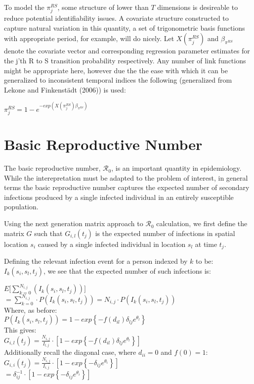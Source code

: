 \documentclass[12pt]{article}
\newcommand \mbreak {\\ \vspace{0.1in}}
\begin{document}
To model the $\pi_j^{RS}$, some structure of lower than $T$ dimensions is desireable to reduce potential 
identifiability issues. A covariate structure constructed to capture natural variation in this quantity,
a set of trigonometric basis functions with appropriate period, for example, will do nicely. Let $X(\pi_j^{RS})$ and $\beta_{\pi^{RS}}$ 
denote the covariate vector and corresponding regression parameter estimates 
for the j'th R to S transition probability respectively. Any number of link functions might be appropriate here, 
however due the the ease with which it can be generalized to inconsistent temporal indices the following (generalized from
Lekone and Finkenst{\"a}dt (2006)) 
is used:

\begin{center}
    $\pi_j^{RS} = 1-e^{-exp(X(\pi_j^{RS}) \beta_{\pi^{RS}})}$
\end{center}
 
\section{Basic Reproductive Number}

The basic reproductive number, $\mathcal{R}_0$, is an important quantity in epidemiology. While the interepretation must be adapted to 
the problem of interest, in general terms the basic reproductive number captures the expected number of secondary 
infections produced by a single infected individual in an entirely susceptible population. 

Using the next generation matrix approach to $\mathcal{R}_0$ calculation, we first define the matrix $G$ such 
that $G_{i,l}(t_j)$ is the expected number of infections in spatial location $s_i$ caused by a single infected
individual in location $s_l$ at time $t_j$.

Defining the relevant infection event for a person indexed by $k$ to be: $I_k(s_i, s_l, t_j)$, we see that the expected number of such
infections is:

\begin{center}
    $\displaystyle E\big[ \sum_{k=0}^{N_{i,j}}(I_k(s_i, s_l, t_j)) \big]$ \mbreak
    $\displaystyle = \sum_{k=0}^{N_{i,j}}\cdot P(I_k(s_i, s_l, t_j)) = N_{i,j}\cdot P(I_k(s_i, s_l, t_j)) $ \mbreak 
    Where, as before: \mbreak
    $ P(I_k(s_i, s_l, t_j)) = 1-exp\left\{-f(d_{il})\delta_{lj}e^{\theta_{l}} \right\}$ \mbreak
    This gives: \mbreak
    $G_{i,l}(t_j) = \frac{N_{i,j}}{I_{l,j}}\cdot \left[1-exp\left\{-f(d_{il})\delta_{lj}e^{\theta_{l}} \right\}\right]$ \mbreak
    Additionally recall the diagonal case, where $d_{ii} = 0$ and $f(0) = 1$:\mbreak 
    $G_{i,i}(t_j) = \frac{N_{i,j}}{I_{i,j}}\cdot \left[1-exp\left\{-\delta_{ij}e^{\theta_{i}} \right\}\right]$ \mbreak
    $ = \delta_{ij}^{-1}\cdot \left[1-exp\left\{-\delta_{ij}e^{\theta_{i}} \right\}\right]$ \mbreak
\end{center}
\end{document}
